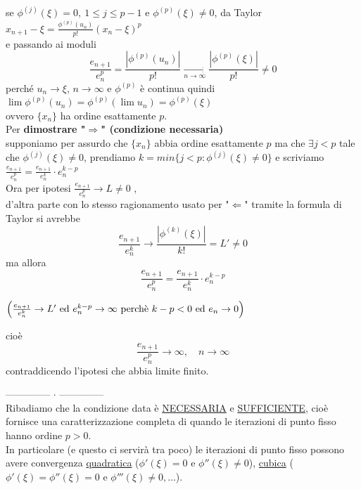 \documentclass[12pt]{article}
\begin{document}
se $\phi^{(j)}(\xi)=0, \ 1\leq j \leq p-1$ e $\phi^{(p)}(\xi)\neq 0$, da Taylor $x_{n+1}-\xi=\frac{\phi^{(p)}(u_n)}{p!}(x_n-\xi)^p$\\
e passando ai moduli
\[\frac{e_{n+1}}{e_n^p}=\frac{|\phi^{(p)}(u_n)|}{p!}\underset{n\to\infty}{\longrightarrow}\frac{|\phi^{(p)}(\xi)|}{p!}\neq 0\]
perché $u_n\rightarrow \xi$, $n\to\infty$ e $\phi^{(p)}$ è continua quindi $\lim \phi^{(p)}(u_n)=\phi^{(p)}(\lim u_n)=\phi^{(p)}(\xi)$\\
ovvero $\{x_n\}$ ha ordine esattamente $p$. \\
Per \textbf{dimostrare "$\Rightarrow$" (condizione necessaria)}\\ supponiamo per assurdo che $\lbrace x_n \rbrace $ abbia ordine esattamente $p$ ma che $\exists j<p$ tale che $\phi^{(j)}(\xi)\neq 0 $, prendiamo $k=min\lbrace j<p:\phi^{(j)}(\xi)\neq0\rbrace$ e scriviamo $\frac{e_{n+1}}{e_n^p} = \frac{e_{n+1}}{e_n^k}\cdot e_n^{k-p}$ \\
Ora per ipotesi $\frac{e_{n+1}}{e_n^p}\rightarrow L \neq 0$ ,\\
d'altra parte con lo stesso ragionamento usato per "$\Leftarrow$" tramite la formula di Taylor si avrebbe
\[\frac{e_{n+1}}{e_n^k}\rightarrow \frac{|\phi^{(k)}(\xi)|}{k!}=L'\neq 0\] 
ma allora
\[\frac{e_{n+1}}{e_n^p} = \frac{e_{n+1}}{e_n^k}\cdot e_n^{k-p}\]
\begin{center}
$\Bigl( \frac{e_{n+1}}{e_n^k} \to L' \text{ ed } e_n^{k-p} \to \infty \text{ perchè } k-p<0 \text{ ed } e_n \to 0 \Bigr)$    
\end{center}

cioè \[\frac{e_{n+1}}{e_n^p} \to \infty, \quad n \to \infty\]
contraddicendo l'ipotesi che abbia limite finito.

\medskip
-------------- $\cdot$ --------------\\
Ribadiamo che la condizione data è \underline{NECESSARIA} e \underline{SUFFICIENTE}, cioè fornisce una caratterizzazione completa di quando le iterazioni di punto fisso hanno ordine $p>0$.\\
In particolare (e questo ci servirà tra poco) le iterazioni di punto fisso possono avere convergenza \underline{quadratica} ($\phi'(\xi)=0$ e $\phi''(\xi)\ne 0$), \underline{cubica} ($\phi'(\xi)=\phi''(\xi)=0$ e $\phi'''(\xi)\ne0, \dotsc$).
\end{document}
